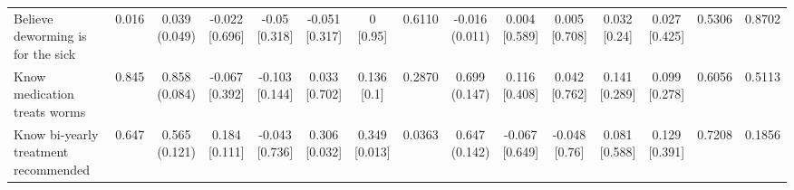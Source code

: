 \documentclass[
]{article}
\begin{document}
\begin{table}
{\begin{tabular}[t]{lcccccccccccccc}
\hspace{1em}Believe deworming is for the sick & 0.016 & \makecell[c]{0.039\\(0.049)} & \makecell[c]{-0.022\\{[0.696]}} & \makecell[c]{-0.05\\{[0.318]}} & \makecell[c]{-0.051\\{[0.317]}} & \makecell[c]{0\\{[0.95]}} & 0.6110 & \makecell[c]{-0.016\\(0.011)} & \makecell[c]{0.004\\{[0.589]}} & \makecell[c]{0.005\\{[0.708]}} & \makecell[c]{0.032\\{[0.24]}} & \makecell[c]{0.027\\{[0.425]}} & 0.5306 & 0.8702\\
\hspace{1em}Know medication treats worms & 0.845 & \makecell[c]{0.858\\(0.084)} & \makecell[c]{-0.067\\{[0.392]}} & \makecell[c]{-0.103\\{[0.144]}} & \makecell[c]{0.033\\{[0.702]}} & \makecell[c]{0.136\\{[0.1]}} & 0.2870 & \makecell[c]{0.699\\(0.147)} & \makecell[c]{0.116\\{[0.408]}} & \makecell[c]{0.042\\{[0.762]}} & \makecell[c]{0.141\\{[0.289]}} & \makecell[c]{0.099\\{[0.278]}} & 0.6056 & 0.5113\\
\hspace{1em}Know bi-yearly treatment recommended & 0.647 & \makecell[c]{0.565\\(0.121)} & \makecell[c]{0.184\\{[0.111]}} & \makecell[c]{-0.043\\{[0.736]}} & \makecell[c]{0.306\\{[0.032]}} & \makecell[c]{0.349\\{[0.013]}} & 0.0363 & \makecell[c]{0.647\\(0.142)} & \makecell[c]{-0.067\\{[0.649]}} & \makecell[c]{-0.048\\{[0.76]}} & \makecell[c]{0.081\\{[0.588]}} & \makecell[c]{0.129\\{[0.391]}} & 0.7208 & 0.1856\\

\end{tabular}}
\end{table}
\end{document}
